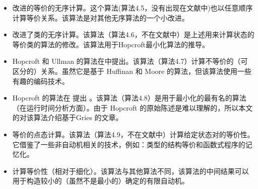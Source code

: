 \begin{itemize}

    \item 改进的等价的无序计算。这个算法(算法4.5，没有出现在文献中)也以任意顺序计算等价关系。该算法是对其他无序算法的一个小改进。

    \item 改进了类的无序计算。该算法（算法4.6，不在文献中）是上述用来计算状态的等价类的算法的修改。该算法用于Hopcroft最小化算法的推导。

    \item Hopcroft 和 Ullman 的算法在\cite{Hu79}中提出。该算法（算法4.7）计算不等价的（可区分的）关系。虽然它是基于 Huffinan \cite{Huff54}和 Moore \cite{Moor56} 的算法，但该算法使用一些有趣的编码技术。

    \item Hopcroft 的算法在 \cite{Hopc71, Grie73} 提出 。该算法（算法4.8）是用于最小化的最有名的算法（在运行时间分析方面）。由于 Hopcroft 的原始陈述是难以理解的，所以本文的对该算法介绍基于Gries 的文章。

    \item 等价的点态计算。该算法（算法4.9，不在文献中）计算给定状态对的等价性。它借鉴了一些非自动机相关的技术，例如：类型的结构等价和函数式程序的记忆化。
    
    \item 计算等价性（相对于细化）。该算法与其他算法不同，该算法的中间结果可以用于构造较小的（虽然不是最小的）确定的有限自动机。


\end{itemize}